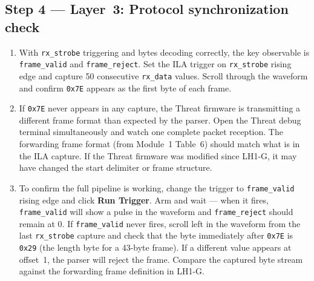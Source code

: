 \documentclass[11pt,letterpaper]{article}
\begin{document}
\subsection{Step 4 --- Layer~3: Protocol synchronization check}
\begin{enumerate}[leftmargin=2em]
	\item With \texttt{rx\_strobe} triggering and bytes decoding correctly, the key observable is \texttt{frame\_valid} and \texttt{frame\_reject}. Set the \mbox{ILA} trigger on \texttt{rx\_strobe} rising edge and capture 50 consecutive \texttt{rx\_data} values. Scroll through the waveform and confirm \texttt{0x7E} appears as the first byte of each frame.
	\item If \texttt{0x7E} never appears in any capture, the Threat firmware is transmitting a different frame format than expected by the parser. Open the Threat debug \UART{} terminal simultaneously and watch one complete packet reception. The forwarding frame format (from Module~1 Table~6) should match what is in the \mbox{ILA} capture. If the Threat firmware was modified since LH1-G, it may have changed the start delimiter or frame structure.
	\item To confirm the full pipeline is working, change the trigger to \texttt{frame\_valid} rising edge and click \textbf{Run Trigger}. Arm and wait --- when it fires, \texttt{frame\_valid} will show a pulse in the waveform and \texttt{frame\_reject} should remain at 0. If \texttt{frame\_valid} never fires, scroll left in the waveform from the last \texttt{rx\_strobe} capture and check that the byte immediately after \texttt{0x7E} is \texttt{0x29} (the length byte for a 43-byte frame). If a different value appears at offset~1, the parser will reject the frame. Compare the captured byte stream against the forwarding frame definition in LH1-G.
\end{enumerate}

\end{document}
